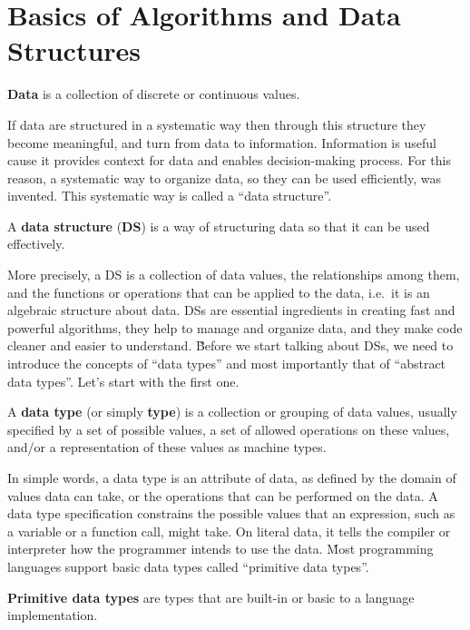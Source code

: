 \section{Basics of Algorithms and Data Structures}

\bd[Data]
\textbf{Data} is a collection of discrete or continuous values.
\ed

If data are structured in a systematic way then through this structure they become meaningful, and turn from data to
information. Information is useful cause it provides context for data and enables decision-making process. For this
reason, a systematic way to organize data, so they can be used efficiently, was invented. This systematic way is
called a ``data structure''.

A \textbf{data structure} (\textbf{DS}) is a way of structuring data so that it can be used effectively.
\ed

More precisely, a DS is a collection of data values, the relationships among them, and the functions or operations that
can be applied to the data, i.e.\ it is an algebraic structure about data. DSs are essential ingredients in creating 
fast and powerful algorithms, they help to manage and organize data, and they make code cleaner and easier to understand.
\v

Before we start talking about DSs, we need to introduce the concepts of ``data types'' and most importantly that of
``abstract data types''. Let's start with the first one.

A \textbf{data type} (or simply \textbf{type}) is a collection or grouping of data values, usually specified by a set
of possible values, a set of allowed operations on these values, and/or a representation of these values as machine
types.
\ed

In simple words, a data type is an attribute of data, as defined by the domain of values data can take, or the
operations that can be performed on the data. A data type specification constrains the possible values that an
expression, such as a variable or a function call, might take. On literal data, it tells the compiler or interpreter
how the programmer intends to use the data. \v

Most programming languages support basic data types called ``primitive data types''.

\textbf{Primitive data types} are types that are built-in or basic to a language implementation.
\ed

